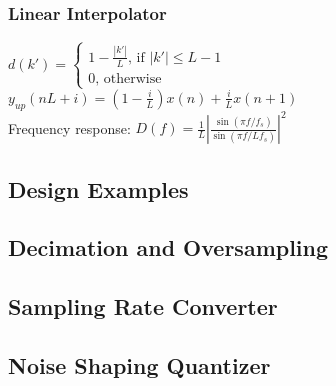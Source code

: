 \subsubsection{Linear Interpolator}
$d(k')=\begin{cases}
1-\frac{|k'|}{L}\text{, if }|k'|\leq L -1\\
0\text{, otherwise}\end{cases}$\\
$y_{up}(nL+i)=(1-\frac{i}{L})x(n)+\frac{i}{L}x(n+1)$\\
Frequency response: $D(f)=\frac{1}{L}\left|\frac{\sin(\pi f/f_s)}{\sin(\pi f/Lf_s)}\right|^2$
\subsection{Design Examples}
\subsection{Decimation and Oversampling}
\subsection{Sampling Rate Converter}
\subsection{Noise Shaping Quantizer}
